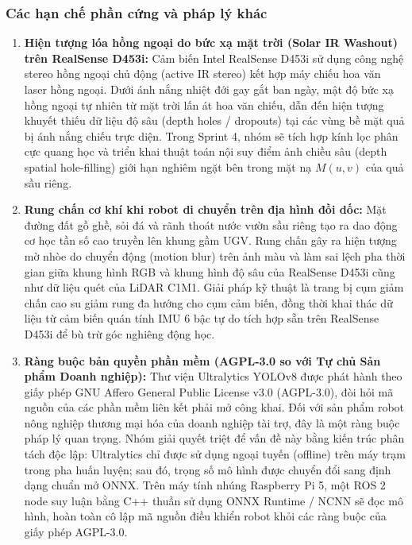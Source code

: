 \documentclass[12pt,a4paper]{article}
\begin{document}
\subsubsection{Các hạn chế phần cứng và pháp lý khác}
\begin{enumerate}
    \item \textbf{Hiện tượng lóa hồng ngoại do bức xạ mặt trời (Solar IR Washout) trên RealSense D453i:}
    Cảm biến Intel RealSense D453i sử dụng công nghệ stereo hồng ngoại chủ động (active IR stereo) kết hợp máy chiếu hoa văn laser hồng ngoại. Dưới ánh nắng nhiệt đới gay gắt ban ngày, mật độ bức xạ hồng ngoại tự nhiên từ mặt trời lấn át hoa văn chiếu, dẫn đến hiện tượng khuyết thiếu dữ liệu độ sâu (depth holes / dropouts) tại các vùng bề mặt quả bị ánh nắng chiếu trực diện. Trong Sprint 4, nhóm sẽ tích hợp kính lọc phân cực quang học và triển khai thuật toán nội suy điểm ảnh chiều sâu (depth spatial hole-filling) giới hạn nghiêm ngặt bên trong mặt nạ $M(u, v)$ của quả sầu riêng.
    
    \item \textbf{Rung chấn cơ khí khi robot di chuyển trên địa hình đồi dốc:}
    Mặt đường đất gồ ghề, sỏi đá và rãnh thoát nước vườn sầu riêng tạo ra dao động cơ học tần số cao truyền lên khung gầm UGV. Rung chấn gây ra hiện tượng mờ nhòe do chuyển động (motion blur) trên ảnh màu và làm sai lệch pha thời gian giữa khung hình RGB và khung hình độ sâu của RealSense D453i cũng như dữ liệu quét của LiDAR C1M1. Giải pháp kỹ thuật là trang bị cụm giảm chấn cao su giảm rung đa hướng cho cụm cảm biến, đồng thời khai thác dữ liệu từ cảm biến quán tính IMU 6 bậc tự do tích hợp sẵn trên RealSense D453i để bù trừ góc nghiêng động học.
    
    \item \textbf{Ràng buộc bản quyền phần mềm (AGPL-3.0 so với Tự chủ Sản phẩm Doanh nghiệp):}
    Thư viện Ultralytics YOLOv8 được phát hành theo giấy phép GNU Affero General Public License v3.0 (AGPL-3.0), đòi hỏi mã nguồn của các phần mềm liên kết phải mở công khai. Đối với sản phẩm robot nông nghiệp thương mại hóa của doanh nghiệp tài trợ, đây là một ràng buộc pháp lý quan trọng. Nhóm giải quyết triệt để vấn đề này bằng kiến trúc phân tách độc lập: Ultralytics chỉ được sử dụng ngoại tuyến (offline) trên máy trạm trong pha huấn luyện; sau đó, trọng số mô hình được chuyển đổi sang định dạng chuẩn mở ONNX. Trên máy tính nhúng Raspberry Pi 5, một ROS 2 node suy luận bằng C++ thuần sử dụng ONNX Runtime / NCNN sẽ đọc mô hình, hoàn toàn cô lập mã nguồn điều khiển robot khỏi các ràng buộc của giấy phép AGPL-3.0.
\end{enumerate}
\end{document}
